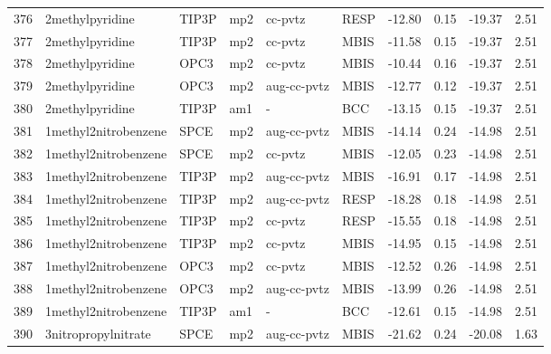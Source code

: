 \begin{tabular}{llllllrrrr}
376 &                2methylpyridine &      TIP3P &      mp2 &      cc-pvtz &         RESP & -12.80 &      0.15 &      -19.37 &     2.51 \\
377 &                2methylpyridine &      TIP3P &      mp2 &      cc-pvtz &         MBIS & -11.58 &      0.15 &      -19.37 &     2.51 \\
378 &                2methylpyridine &       OPC3 &      mp2 &      cc-pvtz &         MBIS & -10.44 &      0.16 &      -19.37 &     2.51 \\
379 &                2methylpyridine &       OPC3 &      mp2 &  aug-cc-pvtz &         MBIS & -12.77 &      0.12 &      -19.37 &     2.51 \\
380 &                2methylpyridine &      TIP3P &      am1 &            - &          BCC & -13.15 &      0.15 &      -19.37 &     2.51 \\
381 &           1methyl2nitrobenzene &       SPCE &      mp2 &  aug-cc-pvtz &         MBIS & -14.14 &      0.24 &      -14.98 &     2.51 \\
382 &           1methyl2nitrobenzene &       SPCE &      mp2 &      cc-pvtz &         MBIS & -12.05 &      0.23 &      -14.98 &     2.51 \\
383 &           1methyl2nitrobenzene &      TIP3P &      mp2 &  aug-cc-pvtz &         MBIS & -16.91 &      0.17 &      -14.98 &     2.51 \\
384 &           1methyl2nitrobenzene &      TIP3P &      mp2 &  aug-cc-pvtz &         RESP & -18.28 &      0.18 &      -14.98 &     2.51 \\
385 &           1methyl2nitrobenzene &      TIP3P &      mp2 &      cc-pvtz &         RESP & -15.55 &      0.18 &      -14.98 &     2.51 \\
386 &           1methyl2nitrobenzene &      TIP3P &      mp2 &      cc-pvtz &         MBIS & -14.95 &      0.15 &      -14.98 &     2.51 \\
387 &           1methyl2nitrobenzene &       OPC3 &      mp2 &      cc-pvtz &         MBIS & -12.52 &      0.26 &      -14.98 &     2.51 \\
388 &           1methyl2nitrobenzene &       OPC3 &      mp2 &  aug-cc-pvtz &         MBIS & -13.99 &      0.26 &      -14.98 &     2.51 \\
389 &           1methyl2nitrobenzene &      TIP3P &      am1 &            - &          BCC & -12.61 &      0.15 &      -14.98 &     2.51 \\
390 &            3nitropropylnitrate &       SPCE &      mp2 &  aug-cc-pvtz &         MBIS & -21.62 &      0.24 &      -20.08 &     1.63 \\

\end{tabular}
